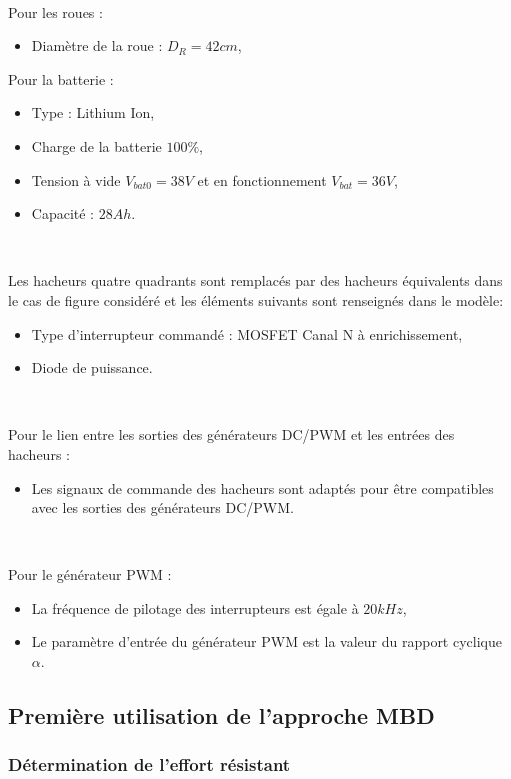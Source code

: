 ~\

Pour les roues :
\begin{itemize}
 \item Diamètre de la roue : $D_R=42cm$,
\end{itemize}

\newpage

Pour la batterie :
\begin{itemize}
 \item Type : Lithium Ion,
 \item Charge de la batterie $100\%$,
 \item Tension à vide $V_{bat0}=38V$ et en fonctionnement $V_{bat}=36V$,
 \item Capacité : $28Ah$.
\end{itemize}

~\

Les hacheurs quatre quadrants sont remplacés par des hacheurs équivalents dans le cas de figure considéré et les éléments suivants sont renseignés dans le modèle:
\begin{itemize}
 \item Type d'interrupteur commandé : MOSFET Canal N à enrichissement,
 \item Diode de puissance.
\end{itemize}

~

Pour le lien entre les sorties des générateurs DC/PWM et les entrées des hacheurs :
\begin{itemize}
 \item Les signaux de commande des hacheurs sont adaptés pour être compatibles avec les sorties des générateurs DC/PWM.
\end{itemize}

~\

Pour le générateur PWM :
\begin{itemize}
 \item La fréquence de pilotage des interrupteurs est égale à $20kHz$,
 \item Le paramètre d'entrée du générateur PWM est la valeur du rapport cyclique $\alpha$.
\end{itemize}

\subsection{Première utilisation de l'approche MBD}

\subsubsection{Détermination de l'effort résistant}

